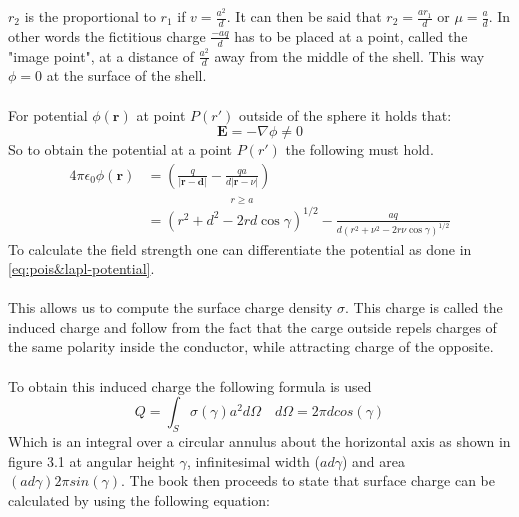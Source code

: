 \noindent $r_2$ is the proportional to $r_1$ if $\displaystyle v = \frac{a^2}{d}$. It can then be said that $\displaystyle r_2 = \frac{ar_1}{d} \text{ or } \mu = \frac{a}{d}$.
In other words the fictitious charge $\displaystyle \frac{-aq}{d}$ has to be placed at a point, called the "image point", at a distance of $\displaystyle \frac{a^2}{d}$ away from the middle of the shell.
This way $\phi = 0 $ at the surface of the shell.\\
\\
\noindent For potential $\phi(\textbf{r})$ at point $P(r')$ outside of the sphere it holds that:
\begin{equation}
    \textbf{E} = -\nabla \phi \neq 0
\end{equation}
\noindent So to obtain the potential at a point $P(r')$ the following must hold.
\begin{equation}
    \begin{aligned}
    4 \pi \epsilon_{0} \phi(\mathbf{r}) & = \left(\frac{q}{|\mathbf{r}-\mathbf{d}|}-\frac{q a}{d|\mathbf{r}-\nu|}\right) \\
    & = \stackrel{r \geq a}{\left(r^{2}+d^{2}-2 r d \cos \gamma\right)^{1 / 2}}-\frac{a q}{d\left(r^{2}+\nu^{2}-2 r \nu \cos \gamma\right)^{1 / 2}}
    \end{aligned}
\end{equation}
To calculate the field strength one can differentiate the potential as done in \ref{eq:pois&lapl-potential}.\\
\\
\noindent This allows us to compute the surface charge density $\sigma$. This charge is called the induced charge and follow from the fact that the carge outside repels charges of the same polarity inside the conductor, while attracting charge of the opposite.\\
\\
\noindent To obtain this induced charge the following formula is used
\begin{equation}
    Q = \int_S \sigma(\gamma)a^2 d\Omega \quad d\Omega = 2\pi d cos(\gamma)
\end{equation}
Which is an integral over a circular annulus about the horizontal axis as shown in figure 3.1 at angular height $\gamma$, infinitesimal width ($ad\gamma$) and area $(ad\gamma)2\pi sin(\gamma)$.
The book then proceeds to state that surface charge can be calculated by using the following equation:

